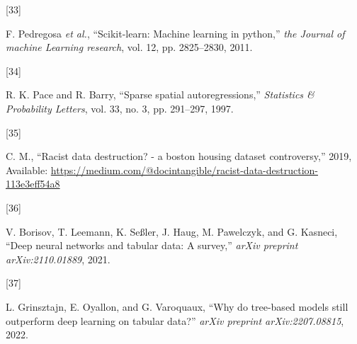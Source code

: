\documentclass[conference,final,]{IEEEtran}
\newlength{\cslhangindent}
\newlength{\csllabelwidth}
\newlength{\cslentryspacingunit} %
\newenvironment{CSLReferences}[2] %
 {%
  \setlength{\parindent}{0pt}
  \ifodd #1
  \let\oldpar\par
  \def\par{\hangindent=\cslhangindent\oldpar}
  \fi
  \setlength{\parskip}{#2\cslentryspacingunit}
 }%
 {}
\newcommand{\CSLLeftMargin}[1]{\parbox[t]{\csllabelwidth}{#1}}
\newcommand{\CSLRightInline}[1]{\parbox[t]{\linewidth - \csllabelwidth}{#1}\break}
\theoremstyle{definition}
\theoremstyle{definition}
\theoremstyle{definition}
\theoremstyle{definition}
\theoremstyle{remark}
\begin{document}
\begin{CSLReferences}{0}{0}
\leavevmode{}%
\CSLLeftMargin{{[}33{]} }%
\CSLRightInline{F. Pedregosa \emph{et al.}, {``Scikit-learn: Machine learning in python,''} \emph{the Journal of machine Learning research}, vol. 12, pp. 2825--2830, 2011.}

\leavevmode{}%
\CSLLeftMargin{{[}34{]} }%
\CSLRightInline{R. K. Pace and R. Barry, {``Sparse spatial autoregressions,''} \emph{Statistics \& Probability Letters}, vol. 33, no. 3, pp. 291--297, 1997.}

\leavevmode{}%
\CSLLeftMargin{{[}35{]} }%
\CSLRightInline{C. M., {``Racist data destruction? - a boston housing dataset controversy,''} 2019, Available: \url{https://medium.com/@docintangible/racist-data-destruction-113e3eff54a8}}

\leavevmode{}%
\CSLLeftMargin{{[}36{]} }%
\CSLRightInline{V. Borisov, T. Leemann, K. Seßler, J. Haug, M. Pawelczyk, and G. Kasneci, {``Deep neural networks and tabular data: A survey,''} \emph{arXiv preprint arXiv:2110.01889}, 2021.}

\leavevmode{}%
\CSLLeftMargin{{[}37{]} }%
\CSLRightInline{L. Grinsztajn, E. Oyallon, and G. Varoquaux, {``Why do tree-based models still outperform deep learning on tabular data?''} \emph{arXiv preprint arXiv:2207.08815}, 2022.}

\end{CSLReferences}
\end{document}
